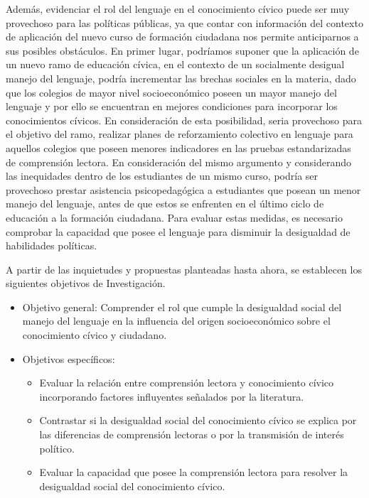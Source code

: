 \documentclass[12pt,twoside]{templates/facsothesis}
\begin{document}
Además, evidenciar el rol del lenguaje en el conocimiento cívico puede ser muy provechoso para las políticas públicas, ya que contar con información del contexto de aplicación del nuevo curso de formación ciudadana nos permite anticiparnos a sus posibles obstáculos. En primer lugar, podríamos suponer que la aplicación de un nuevo ramo de educación cívica, en el contexto de un socialmente desigual manejo del lenguaje, podría incrementar las brechas sociales en la materia, dado que los colegios de mayor nivel socioeconómico poseen un mayor manejo del lenguaje y por ello se encuentran en mejores condiciones para incorporar los conocimientos cívicos. En consideración de esta posibilidad, seria provechoso para el objetivo del ramo, realizar planes de reforzamiento colectivo en lenguaje para aquellos colegios que poseen menores indicadores en las pruebas estandarizadas de comprensión lectora. En consideración del mismo argumento y considerando las inequidades dentro de los estudiantes de un mismo curso, podría ser provechoso prestar asistencia psicopedagógica a estudiantes que posean un menor manejo del lenguaje, antes de que estos se enfrenten en el último ciclo de educación a la formación ciudadana. Para evaluar estas medidas, es necesario comprobar la capacidad que posee el lenguaje para disminuir la desigualdad de habilidades políticas.

A partir de las inquietudes y propuestas planteadas hasta ahora, se establecen los siguientes objetivos de Investigación.

\begin{itemize}
\item
  Objetivo general: Comprender el rol que cumple la desigualdad social del manejo del lenguaje en la influencia del origen socioeconómico sobre el conocimiento cívico y ciudadano.
\item
  Objetivos específicos:

  \begin{itemize}
  \item
    Evaluar la relación entre comprensión lectora y conocimiento cívico incorporando factores influyentes señalados por la literatura.
  \item
    Contrastar si la desigualdad social del conocimiento cívico se explica por las diferencias de comprensión lectoras o por la transmisión de interés político.
  \item
    Evaluar la capacidad que posee la comprensión lectora para resolver la desigualdad social del conocimiento cívico.
  \end{itemize}
\end{itemize}
\end{document}
